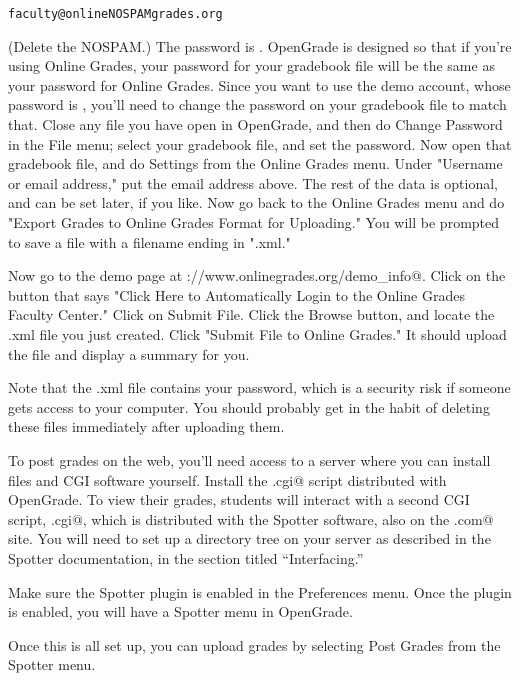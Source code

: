 \documentclass{opengrade_doc}
\begin{document}
\verb|faculty@onlineNOSPAMgrades.org|

(Delete the NOSPAM.) The password is \verb@faculty@. OpenGrade is designed so that if you're using Online Grades,
your password for your gradebook file will be the same as your password for Online Grades.
Since you want to use the demo account, whose password is \verb@faculty@, you'll need to change
the password on your gradebook file to match that. Close any file you have open in OpenGrade,
and then do Change Password in the File menu; select your gradebook file, and set the password.
Now open that gradebook file, and do Settings from the Online Grades menu.
Under "Username or email address," put the email address above. The rest of the data is optional,
and can be set later, if you like. Now go back to the Online Grades menu and do
"Export Grades to Online Grades Format for Uploading." You will be prompted to save a file
with a filename ending in ".xml."

Now go to the demo page at \verb@http://www.onlinegrades.org/demo_info@.
Click on the button that says "Click Here to Automatically Login to the Online Grades
Faculty Center." Click on Submit File. Click the Browse button, and locate the
.xml file you just created. Click "Submit File to Online Grades." It should upload the file
and display a summary for you.

Note that the .xml file contains your password, which is a security risk if someone gets access
to your computer. You should probably get in the habit of deleting these files immediately
after uploading them.


To post grades on the web, you'll need access to a server
where you can install files and CGI software yourself.
Install the \verb@ServerOG.cgi@ script
distributed with OpenGrade. To view their grades, students
will interact with a second CGI script, \verb@Spotter.cgi@, which
is distributed with the Spotter software, also on the
\verb@lightandmatter.com@ site. You will need to set up
a directory tree on your server as described in the Spotter
documentation, in the section titled ``Interfacing.''

Make sure the Spotter plugin is enabled in the Preferences menu.
Once the plugin is enabled, you will have a Spotter menu in OpenGrade.

Once this is all set up, you can upload grades by selecting
Post Grades from the Spotter menu.
\end{document}
